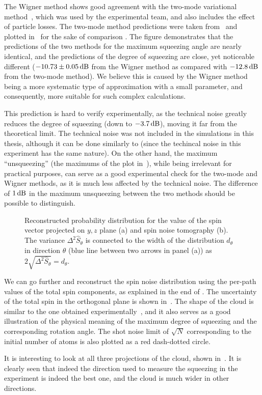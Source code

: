 The Wigner method shows good agreement with the two-mode variational method~\cite{Li2009}, which was used by the experimental team, and also includes the effect of particle losses.
The two-mode method predictions were taken from~\cite{Riedel2010} and plotted in~ for the sake of comparison .
The figure demonstrates that the predictions of the two methods for the maximum squeezing angle are nearly identical, and the predictions of the degree of squeezing are close, yet noticeable different ($-10.73\pm0.05\mbox{\ensuremath{\,\mathrm{dB}}}$ from the Wigner method as compared with $-12.8\mbox{\ensuremath{\,\mathrm{dB}}}$ from the two-mode method).
We believe this is caused by the Wigner method being a more systematic type of approximation with a small parameter, and consequently, more suitable for such complex calculations.

This prediction is hard to verify experimentally, as the technical noise greatly reduces the degree of squeezing (down to $-3.7\mbox{\ensuremath{\,\mathrm{dB}}}$), moving it far from the theoretical limit.
The technical noise was not included in the simulations in this thesis, although it can be done similarly to  (since the techincal noise in this experiment has the same nature).
On the other hand, the maximum ``unsqueezing'' (the maximums of the plot in~), while being irrelevant for practical purposes, can serve as a good experimental check for the two-mode and Wigner methods, as it is much less affected by the technical noise.
The difference of $1\mbox{\ensuremath{\,\mathrm{dB}}}$ in the maximum unsqueezing between the two methods should be possible to distinguish.

\begin{figure}

    \caption{
    Reconstructed probability distribution for the value of the spin vector projected on $y,z$ plane (a) and spin noise tomography (b).
    The variance $\Delta^2 \hat{S}_\theta$ is connected to the width of the distribution $d_\theta$ in direction $\theta$
    (blue line between two arrows in panel (a)) as
    $2 \sqrt{\Delta^2 \hat{S}_\theta} = d_\theta$.}
    \label{fig:bec-squeezing:separation:cloud-yz}
\end{figure}

We can go further and reconstruct the spin noise distribution using the per-path values of the total spin components, as explained in the end of .
The uncertainty of the total spin in the orthogonal plane is shown in~.
The shape of the cloud is similar to the one obtained experimentally~\cite{Riedel2010}, and it also serves as a good illustration of the physical meaning of the maximum degree of squeezing and the corresponding rotation angle.
The shot noise limit of $\sqrt{N}$ corresponding to the initial number of atoms is also plotted as a red dash-dotted circle.

It is interesting to look at all three projections of the cloud, shown in~.
It is clearly seen that indeed the direction used to measure the squeezing in the experiment is indeed the best one, and the cloud is much wider in other directions.
